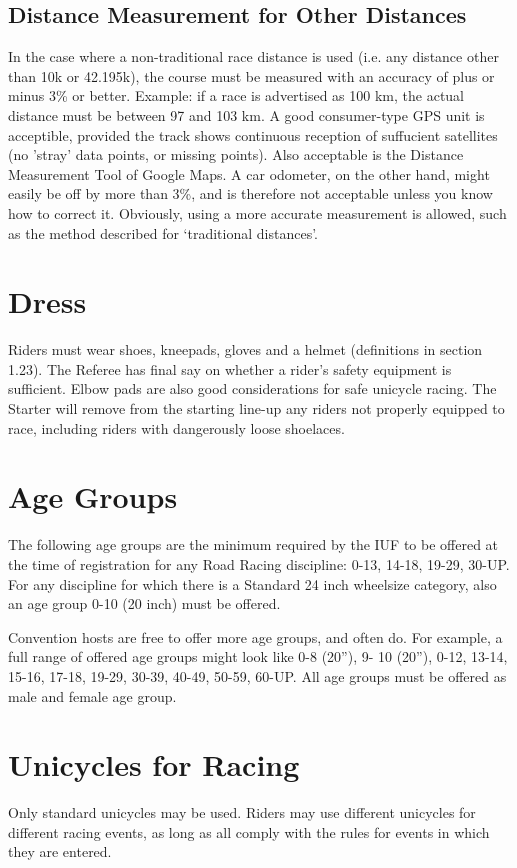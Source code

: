 \subsection {Distance Measurement for Other Distances}
In the case where a non-traditional race distance is used (i.e. any distance other than 10k or 42.195k), the course must be measured with an accuracy of plus or minus 3\% or better. Example: if a race is advertised as 100 km, the actual distance must be between 97 and 103 km. A good consumer-type GPS unit is acceptible, provided the track shows continuous reception of suffucient satellites (no 'stray' data points, or missing points). Also acceptable is the Distance Measurement Tool of Google Maps. A car odometer, on the other hand, might easily be off by more than 3\%, and is therefore not acceptable unless you know how to correct it. Obviously, using a more accurate measurement is allowed, such as the method described for ‘traditional distances’.

\section{Dress}
Riders must wear shoes, kneepads, gloves and a helmet (definitions in section 1.23). The Referee has final say on whether a rider’s safety equipment is sufficient. Elbow pads are also good considerations for safe unicycle racing. The Starter will remove from the starting line-up any riders not properly equipped to race, including riders with dangerously loose shoelaces.

\section{Age Groups}
The following age groups are the minimum required by the IUF to be offered at the time of registration for any Road Racing discipline: 0-13, 14-18, 19-29, 30-UP. For any discipline for which there is a Standard 24 inch wheelsize category, also an age group 0-10 (20 inch) must be offered.

Convention hosts are free to offer more age groups, and often do. For example, a full range of offered age groups might look like 0-8 (20”), 9- 10 (20”), 0-12, 13-14, 15-16, 17-18, 19-29, 30-39, 40-49, 50-59, 60-UP. All age groups must be offered as male and female age group.

\section{Unicycles for Racing}
Only standard unicycles may be used. Riders may use different unicycles for different racing events, as long as all comply with the rules for events in which they are entered.
